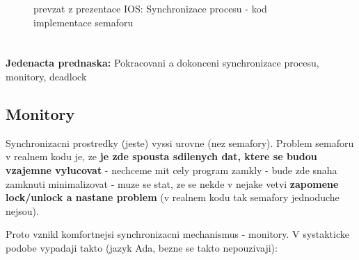 \documentclass[a4paper, 11pt]{article}
\begin{document}
\begin{figure} [h]
    \centering
    \caption{prevzat z prezentace IOS: Synchronizace procesu - kod implementace semaforu}
\end{figure}

\newpage
\section{}
\textbf{Jedenacta prednaska:} Pokracovani a dokonceni synchronizace procesu, monitory, deadlock

\subsection{Monitory}
Synchronizacni prostredky (jeste) vyssi urovne (nez semafory). Problem semaforu v realnem kodu je, ze \textbf{je zde spousta sdilenych dat, ktere se budou vzajemne vylucovat} - nechceme mit cely program zamkly - bude zde snaha zamknuti minimalizovat - muze se stat, ze se nekde v nejake vetvi \textbf{zapomene lock/unlock a nastane problem} (v realnem kodu tak semafory jednoduche nejsou).

Proto vznikl komfortnejsi synchronizacni mechanismus - monitory. V systakticke podobe vypadaji takto (jazyk Ada, bezne se takto nepouzivaji):
\end{document}
